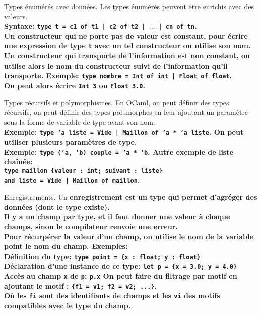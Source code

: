 \documentclass[french, 11pt]{article}
\begin{document}
\begin{defi}{Types énumérés avec données.}{}
    Les types énumérés peuvent être enrichis avec des valeurs.\\
    \bf{Syntaxe:} \texttt{type t = c1 of t1 | c2 of t2 | $\dots$ | cn of tn}.\\
    Un constructeur qui ne porte pas de valeur est constant, pour écrire une expression de type \texttt{t} avec un tel constructeur on utilise son nom.\\
    Un constructeur qui transporte de l'information est non constant, on utilise alors le nom du constructeur suivi de l'information qu'il transporte.\n
    \bf{Exemple:} \texttt{type nombre = Int of int | Float of float}.\\
    On peut alors écrire \texttt{Int 3} ou \texttt{Float 3.0}.
\end{defi}

\begin{defi}{Types récursifs et polymorphismes.}{}
    En OCaml, on peut définir des types récursifs, on peut définir des types polumorphes en leur ajoutant un paramètre sous la forme de variable de type avant son nom.\\
    \bf{Exemple:} \texttt{type 'a liste = Vide | Maillon of 'a * 'a liste}.\n
    On peut utiliser plusieurs paramètres de type.\\
    \bf{Exemple:} \texttt{type ('a, 'b) couple = 'a * 'b}.\n
    Autre exemple de liste chaînée:\\
    \texttt{type maillon  \{valeur : int; suivant : liste\}\\
    and liste = Vide | Maillon of maillon}.
\end{defi}

\begin{defi}{Enregistrements.}{}
    Un \bf{enregistrement} est un type qui permet d'agréger des données (dont le type existe).\\
    Il y a un champ par type, et il faut donner une valeur à chaque champs, sinon le compilateur renvoie une erreur.\\
    Pour récurpérer la valeur d'un champ, on utilise le nom de la variable point le nom du champ.\n
    \bf{Exemples:}\\
    Définition du type: \texttt{type point = \{x : float; y : float\}}\\
    Déclaration d'une instance de ce type: \texttt{let p = \{x = 3.0; y = 4.0\}}\\
    Accès au champ \texttt{x} de \texttt{p}: \texttt{p.x}\n
    On peut faire du filtrage par motif en ajoutant le motif : \texttt{\{f1 = v1; f2 = v2; ...\}}.\\
    Où les \texttt{fi} sont des identifiants de champs et les \texttt{vi} des motifs compatibles avec le type du champ.
\end{defi}
\end{document}
